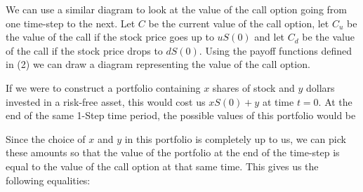 \documentclass[letterpaper,12pt]{article}
\theoremstyle{plain}
\numberwithin{equation}{section}
\begin{document}
We can use a similar diagram to look at the value of the call option going from one time-step to the next. Let $C$ be the current value of the call option, let $C_u$ be the value of the call if the stock price goes up to $uS(0)$ and let $C_d$ be the value of the call if the stock price drops to $dS(0)$. Using the payoff functions defined in (2) we can draw a diagram representing the value of the call option. 
\begin{figure}[H]
\centering
{}
\end{figure}
If we were to construct a portfolio containing $x$ shares of stock and $y$ dollars invested in a risk-free asset, this would cost us $xS(0) + y$ at time $t = 0$. At the end of the same 1-Step time period, the possible values of this portfolio would be

\begin{figure}[H]
\centering
{}
\end{figure}
Since the choice of $x$ and $y$ in this portfolio is completely up to us, we can pick these amounts so that the value of the portfolio at the end of the time-step is equal to the value of the call option at that same time. This gives us the following equalities:
\end{document}
